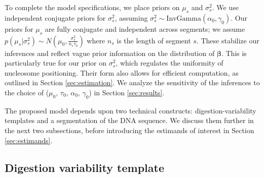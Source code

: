 To complete the model specifications, we place priors on $\mu_{s}$ and $\sigma^2_{s}$.
We use independent conjugate priors for $\sigma^2_{s}$, assuming $\sigma^2_{s} \sim \mathrm{InvGamma}(\alpha_0, \gamma_0)$.
Our priors for $\mu_{s}$ are fully conjugate and independent across segments; we assume $p(\mu_{s} | \sigma^2_{s}) \sim N(\mu_0, \frac{\sigma^2_{s}}{n_{s} \tau_0})$ where $n_{s}$ is the length of segment $s$.
These stabilize our inferences and reflect vague prior information on the distribution of $\bm \beta$.
This is particularly true for our prior on $\sigma^2_{s}$, which regulates the uniformity of nucleosome positioning.
Their form also allows for efficient computation, as outlined in Section \ref{sec:estimation}.
%
We analyze the sensitivity of the inferences to the choice of ($\mu_0$,  $\tau_0$, $\alpha_0$, $\gamma_0$) in Section \ref{sec:results}.


%


The proposed model depends upon two technical constructs: digestion-variability templates and a  segmentation of the DNA sequence. We discuss them further in the next two subsections, before introducing the estimands of interest in Section \ref{sec:estimands}.

\subsection{Digestion variability template}
\label{sec:template}


